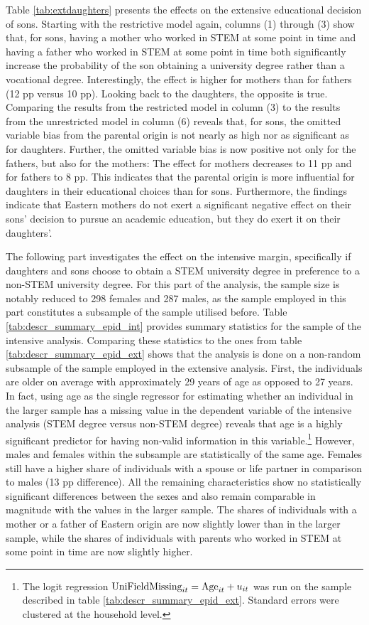 \documentclass[a4paper, oneside, hyperfootnotes = false]{article}
\begin{document}
{Table \ref{tab:extdaughters} presents the effects on the extensive educational decision of sons.
Starting with the restrictive model again, columns (1) through (3) show that, for sons, having a mother who worked in STEM at some point in time and having a father who worked in STEM at some point in time both significantly increase the probability of the son obtaining a university degree rather than a vocational degree.
Interestingly, the effect is higher for mothers than for fathers (12 pp versus 10 pp).
Looking back to the daughters, the opposite is true.
Comparing the results from the restricted model in column (3) to the results from the unrestricted model in column (6) reveals that, for sons, the omitted variable bias from the parental origin is not nearly as high nor as significant as for daughters.
Further, the omitted variable bias is now positive not only for the fathers, but also for the mothers:
The effect for mothers decreases to 11 pp and for fathers to 8 pp.
This indicates that the parental origin is more influential for daughters in their educational choices than for sons.
Furthermore, the findings indicate that Eastern mothers do not exert a significant negative effect on their sons' decision to pursue an academic education, but they do exert it on their daughters'.

The following part investigates the effect on the intensive margin, specifically if daughters and sons choose to obtain a STEM university degree in preference to a non-STEM university degree.
For this part of the analysis, the sample size is notably reduced to 298 females and 287 males, as the sample employed in this part constitutes a subsample of the sample utilised before.
Table \ref{tab:descr_summary_epid_int} provides summary statistics for the sample of the intensive analysis.
Comparing these statistics to the ones from table \ref{tab:descr_summary_epid_ext} shows that the analysis is done on a non-random subsample of the sample employed in the extensive analysis.
First, the individuals are older on average with approximately 29 years of age as opposed to 27 years.
In fact, using age as the single regressor for estimating whether an individual in the larger sample has a missing value in the dependent variable of the intensive analysis (STEM degree versus non-STEM degree) reveals that age is a highly significant predictor for having non-valid information in this variable.\footnote{The logit regression $\textnormal{UniFieldMissing}_{it} = \textnormal{Age}_{it} + u_{it}$ was run on the sample described in table \ref{tab:descr_summary_epid_ext}. Standard errors were clustered at the household level.}
However, males and females within the subsample are statistically of the same age.
Females still have a higher share of individuals with a spouse or life partner in comparison to males (13 pp difference).
All the remaining characteristics  show no statistically significant differences between the sexes and also remain comparable in magnitude with the values in the larger sample.
The shares of individuals with a mother or a father of Eastern origin are now slightly lower than in the larger sample, while the shares of individuals with parents who worked in STEM at some point in time are now slightly higher.

}
\end{document}
